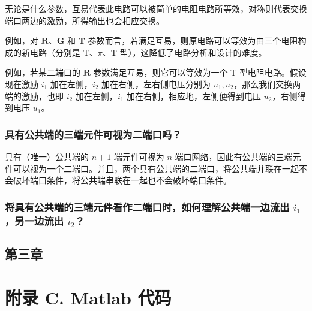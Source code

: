 \documentclass[UTF8]{report}
\theoremstyle{MyLineTheoremStyle} %
\theoremstyle{MyBlockTheoremStyle} %
\theoremstyle{MySubsubsectionStyle} %
\begin{document}
无论是什么参数，互易代表此电路可以被简单的电阻电路所等效，对称则代表交换端口两边的激励，所得输出也会相应交换。

例如，对 $\boldsymbol{R}$、$\boldsymbol{G}$ 和 $\boldsymbol{T}$ 参数而言，若满足互易，则原电路可以等效为由三个电阻构成的新电路（分别是 T、$\pi$、T 型），这降低了电路分析和设计的难度。

例如，若某二端口的 $\boldsymbol{R}$ 参数满足互易，则它可以等效为一个 T 型电阻电路。假设现在激励 $i_1$ 加在左侧，$i_2$ 加在右侧，左右侧电压分别为 $u_1, u_2$，那么我们交换两端的激励，也即 $i_2$ 加在左侧，$i_1$ 加在右侧，相应地，左侧便得到电压 $u_2$，右侧得到电压 $u_1$。

\subsection{具有公共端的三端元件可视为二端口吗？}

具有（唯一）公共端的 $n+1$ 端元件可视为 $n$ 端口网络，因此有公共端的三端元件可以视为一个二端口。并且，两个具有公共端的二端口，将公共端并联在一起不会破坏端口条件，将公共端串联在一起也不会破坏端口条件。

\subsection{将具有公共端的三端元件看作二端口时，如何理解公共端一边流出 $i_1$，另一边流出 $i_2$？}

\section{第三章}
















\chapter*{附录 C. Matlab 代码}   
\thispagestyle{fancy} 
\setcounter{section}{0}   
\renewcommand\thesection{C.\arabic{section}}   
\renewcommand{\thefigure}{C.\arabic{figure}} 
\renewcommand{\thetable}{C.\arabic{table}}
\end{document}
